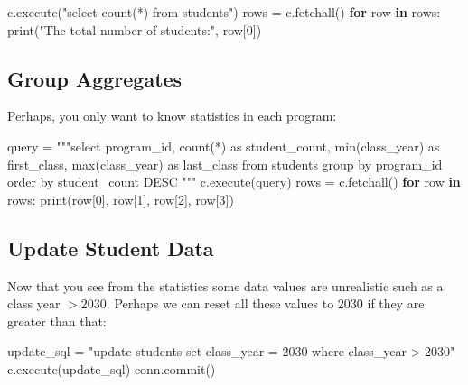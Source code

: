 \documentclass[
  letterpaper,
]{scrbook}
\newenvironment{Shaded}{\begin{snugshade}}{\end{snugshade}}
\newcommand{\BuiltInTok}[1]{\textcolor[rgb]{0.00,0.23,0.31}{#1}}
\newcommand{\ControlFlowTok}[1]{\textcolor[rgb]{0.00,0.23,0.31}{\textbf{#1}}}
\newcommand{\DecValTok}[1]{\textcolor[rgb]{0.68,0.00,0.00}{#1}}
\newcommand{\KeywordTok}[1]{\textcolor[rgb]{0.00,0.23,0.31}{\textbf{#1}}}
\newcommand{\NormalTok}[1]{\textcolor[rgb]{0.00,0.23,0.31}{#1}}
\newcommand{\OperatorTok}[1]{\textcolor[rgb]{0.37,0.37,0.37}{#1}}
\newcommand{\StringTok}[1]{\textcolor[rgb]{0.13,0.47,0.30}{#1}}
\begin{document}
\begin{Shaded}
\begin{Highlighting}[]
\NormalTok{c.execute(}\StringTok{"select count(*) from students"}\NormalTok{)}
\NormalTok{rows }\OperatorTok{=}\NormalTok{ c.fetchall()}
\ControlFlowTok{for}\NormalTok{ row }\KeywordTok{in}\NormalTok{ rows: }
    \BuiltInTok{print}\NormalTok{(}\StringTok{"The total number of students:"}\NormalTok{, row[}\DecValTok{0}\NormalTok{])}
\end{Highlighting}
\end{Shaded}

\subsection*{Group Aggregates}\label{group-aggregates-1}

Perhaps, you only want to know statistics in each program:

\begin{Shaded}
\begin{Highlighting}[]
\NormalTok{query }\OperatorTok{=} \StringTok{"""select program\_id, }
\StringTok{       count(*) as student\_count, }
\StringTok{       min(class\_year) as first\_class, }
\StringTok{       max(class\_year) as last\_class}
\StringTok{from students }
\StringTok{group by program\_id}
\StringTok{order by student\_count DESC}
\StringTok{"""}
\NormalTok{c.execute(query)}
\NormalTok{rows }\OperatorTok{=}\NormalTok{ c.fetchall()}
\ControlFlowTok{for}\NormalTok{ row }\KeywordTok{in}\NormalTok{ rows: }
    \BuiltInTok{print}\NormalTok{(row[}\DecValTok{0}\NormalTok{], row[}\DecValTok{1}\NormalTok{], row[}\DecValTok{2}\NormalTok{], row[}\DecValTok{3}\NormalTok{])}
\end{Highlighting}
\end{Shaded}

\subsection*{Update Student Data}\label{update-student-data-1}

Now that you see from the statistics some data values are unrealistic
such as a class year \(>2030\). Perhaps we can reset all these values to
\(2030\) if they are greater than that:

\begin{Shaded}
\begin{Highlighting}[]
\NormalTok{update\_sql }\OperatorTok{=} \StringTok{"update students set class\_year = 2030 where class\_year \textgreater{} 2030"}
\NormalTok{c.execute(update\_sql)}
\NormalTok{conn.commit()}
\end{Highlighting}
\end{Shaded}
\end{document}
